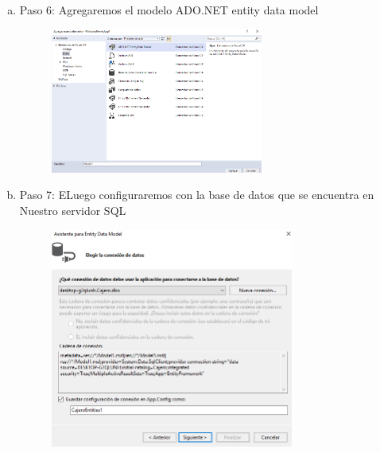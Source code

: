 \begin{enumerate}[1.]
\begin{enumerate}[a)]
\begin{figure}[H]
\begin{center}
		\end{center}
		\end{figure}
	\item Paso 6: Agregaremos el modelo ADO.NET entity data model
		\begin{figure}[H]
		\begin{center}
		\includegraphics[width=7cm]{./Imagenes/img6}
		\end{center}
		\end{figure}
	\item Paso 7: ELuego configuraremos con la base de datos que se encuentra en Nuestro servidor SQL 
		\begin{figure}[H]
		\begin{center}
		\includegraphics[width=8cm]{./Imagenes/img7}
		\end{center}
		\end{figure}
	\end{enumerate}


\end{enumerate}
